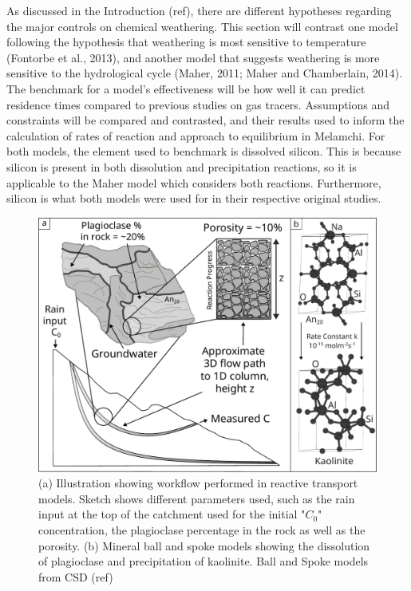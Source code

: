 As discussed in the Introduction (ref), there are different hypotheses regarding the major controls on chemical weathering. This section will contrast one model following the hypothesis that weathering is most sensitive to temperature (Fontorbe et al., 2013), and another model that suggests weathering is more sensitive to the hydrological cycle (Maher, 2011; Maher and Chamberlain, 2014). The benchmark for a model's effectiveness will be how well it can predict residence times compared to previous studies on gas tracers. Assumptions and constraints will be compared and contrasted, and their results used to inform the calculation of rates of reaction and approach to equilibrium in Melamchi. For both models, the element used to benchmark is dissolved silicon. This is because silicon is present in both dissolution and precipitation reactions, so it is applicable to the Maher model which considers both reactions. Furthermore, silicon is what both models were used for in their respective original studies.


\begin{figure}[h]
    \centering
    \includegraphics[width=\textwidth]{sketch.pdf}
    \caption{(a) Illustration showing workflow performed in reactive transport models. Sketch shows different parameters used, such as the rain input at the top of the catchment used for the initial "$C_0$" concentration, the plagioclase percentage in the rock as well as the porosity. (b) Mineral ball and spoke models showing the dissolution of plagioclase and precipitation of kaolinite. Ball and Spoke models from CSD (ref)}
    \label{fig:reactsketch}
\end{figure}

